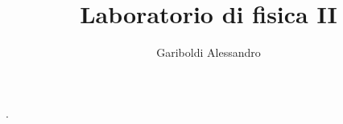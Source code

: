 \documentclass[a4paper, oneside]{article}
\title{Laboratorio di fisica II}
\author{Gariboldi Alessandro}
\date{ }
\begin{document}
                {}          %
                {}          %
                {\slshape}  %
                {}          %
                {\bfseries} %
                {.}         %
                {\newline}         %
                {}          %
\theoremstyle{theoremEnv}

\newtheorem{definition}{Definizione}[section]
\newtheorem{theorem}{Teorema}[section]
\newtheorem{lemma}{Lemma}[section]
\newtheorem{observation}{Oss.}[section]
\newtheorem{corollary}{Corollario}[theorem]
\newtheorem{example}{Esempio}[section]
\newtheorem{problem}{Problema}[section]
\newtheorem{solution}{Soluzione}[section]
\newtheorem{proposition}{Proposizione}[section]


\maketitle
\end{document}
